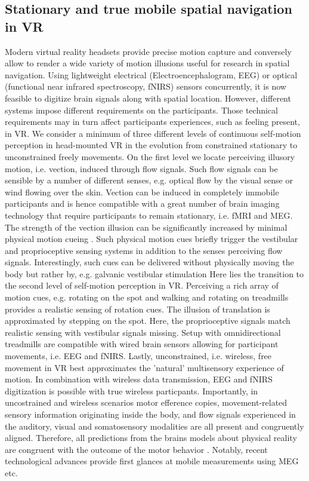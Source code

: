 \subsection{Stationary and true mobile spatial navigation in VR}

Modern virtual reality headsets provide precise motion capture and conversely allow to render a wide variety of motion illusions useful for research in spatial navigation. Using lightweight electrical (Electroencephalogram, EEG) or optical (functional near infrared spectroscopy, fNIRS) sensors concurrently, it is now feasible to digitize brain signals along with spatial location. However, different systems impose different requirements on the participants. Those technical requirements may in turn affect participants experiences, such as feeling present, in VR. \cite{} %
We consider a minimum of three different levels of continuous self-motion perception in head-mounted VR in the evolution from constrained stationary to unconstrained freely movements. On the first level we locate perceiving illusory motion, i.e. vection, induced through flow signals. Such flow signals can be sensible by a number of different senses, e.g. optical flow by the visual sense or wind flowing over the skin. Vection can be induced in completely immobile participants and is hence compatible with a great number of brain imaging technology that require participants to remain stationary, i.e. fMRI and MEG. The strength of the vection illusion can be significantly increased by minimal physical motion cueing \cite{}. %
Such physical motion cues briefly trigger the vestibular and proprioceptive sensing systems in addition to the senses perceiving flow signals. Interestingly, such cues can be delivered without physically moving the body but rather by, e.g. galvanic vestibular stimulation \cite{} %
Here lies the transition to the second level of self-motion perception in VR. Perceiving a rich array of motion cues, e.g. rotating on the spot and walking and rotating on treadmills provides a realistic sensing of rotation cues. The illusion of translation is approximated by stepping on the spot. Here, the proprioceptive signals match realistic sensing with vestibular signals missing. Setup with omnidirectional treadmills are compatible with wired brain sensors allowing for participant movements, i.e. EEG and fNIRS. %
Lastly, unconstrained, i.e. wireless, free movement in VR best approximates the 'natural' multisensory experience of motion. In combination with wireless data transmission, EEG and fNIRS digitization is possible with true wireless particpants. Importantly, in uncostrained and wireless scenarios motor efference copies, movement-related sensory information originating inside the body, and flow signals experienced in the auditory, visual and somatosensory modalities are all present and congruently aligned. Therefore, all predictions from the brains models about physical reality are congruent with the outcome of the motor behavior \cite{}. %
Notably, recent technological advances provide first glances at mobile measurements using MEG etc. %